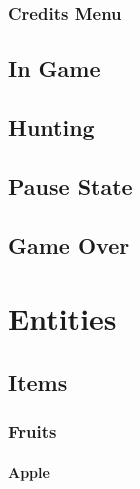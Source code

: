 \documentclass{report}
\begin{document}
    \subsection{Credits Menu} %
    \label{sub:credits_menu}


  \section{In Game} %
  \label{sec:in_game}


  \section{Hunting} %
  \label{sec:hunting}


  \section{Pause State} %
  \label{sec:pause_state}


  \section{Game Over} %
  \label{sec:game_over}


\chapter{Entities} %
\label{cha:entities}

  \section{Items} %
  \label{sec:items}

    \subsection{Fruits} %
    \label{sub:fruits}

      \subsubsection{Apple} %
      \label{ssub:apple}
\end{document}
